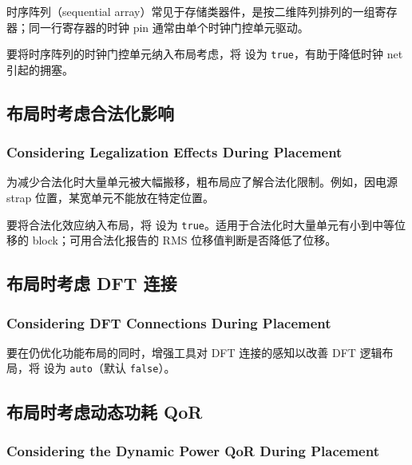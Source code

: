时序阵列（sequential array）常见于存储类器件，是按二维阵列排列的一组寄存器；同一行寄存器的时钟 pin 通常由单个时钟门控单元驱动。

要将时序阵列的时钟门控单元纳入布局考虑，将  设为 \texttt{true}，有助于降低时钟 net 引起的拥塞。

\subsection{布局时考虑合法化影响}
\subsubsection*{Considering Legalization Effects During Placement}

为减少合法化时大量单元被大幅搬移，粗布局应了解合法化限制。例如，因电源 strap 位置，某宽单元不能放在特定位置。

要将合法化效应纳入布局，将  设为 \texttt{true}。适用于合法化时大量单元有小到中等位移的 block；可用合法化报告的 RMS 位移值判断是否降低了位移。

\subsection{布局时考虑 DFT 连接}
\subsubsection*{Considering DFT Connections During Placement}

要在仍优化功能布局的同时，增强工具对 DFT 连接的感知以改善 DFT 逻辑布局，将  设为 \texttt{auto}（默认 \texttt{false}）。

\subsection{布局时考虑动态功耗 QoR}
\subsubsection*{Considering the Dynamic Power QoR During Placement}

